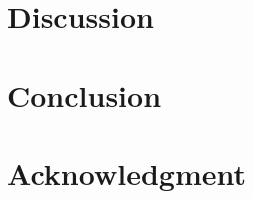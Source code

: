 \documentclass[journal,twoside,web]{IEEEtran}
\begin{document}
\section{Discussion}

\section{Conclusion}

\section*{Acknowledgment}



\end{document}

